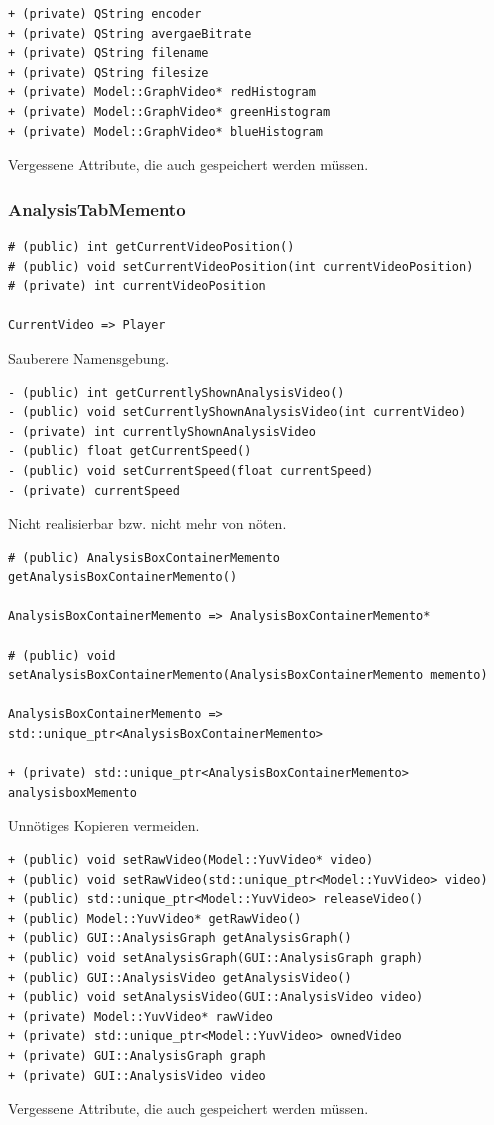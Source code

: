 \documentclass{scrartcl}
\begin{document}
{\begin{verbatim}
+ (private) QString encoder
+ (private) QString avergaeBitrate
+ (private) QString filename
+ (private) QString filesize
+ (private) Model::GraphVideo* redHistogram
+ (private) Model::GraphVideo* greenHistogram
+ (private) Model::GraphVideo* blueHistogram
\end{verbatim}
Vergessene Attribute, die auch gespeichert werden müssen.
\newpage
\subsubsection{AnalysisTabMemento}
\bigskip
\begin{verbatim}
# (public) int getCurrentVideoPosition()
# (public) void setCurrentVideoPosition(int currentVideoPosition)
# (private) int currentVideoPosition

CurrentVideo => Player
\end{verbatim}
Sauberere Namensgebung.
\bigskip
\begin{verbatim}
- (public) int getCurrentlyShownAnalysisVideo()
- (public) void setCurrentlyShownAnalysisVideo(int currentVideo)
- (private) int currentlyShownAnalysisVideo
- (public) float getCurrentSpeed()
- (public) void setCurrentSpeed(float currentSpeed)
- (private) currentSpeed
\end{verbatim}
Nicht realisierbar bzw. nicht mehr von nöten.
\bigskip
\begin{verbatim}
# (public) AnalysisBoxContainerMemento getAnalysisBoxContainerMemento()

AnalysisBoxContainerMemento => AnalysisBoxContainerMemento*

# (public) void setAnalysisBoxContainerMemento(AnalysisBoxContainerMemento memento)

AnalysisBoxContainerMemento => std::unique_ptr<AnalysisBoxContainerMemento>

+ (private) std::unique_ptr<AnalysisBoxContainerMemento> analysisboxMemento
\end{verbatim}
Unnötiges Kopieren vermeiden.
\bigskip
\begin{verbatim}
+ (public) void setRawVideo(Model::YuvVideo* video)
+ (public) void setRawVideo(std::unique_ptr<Model::YuvVideo> video)
+ (public) std::unique_ptr<Model::YuvVideo> releaseVideo()
+ (public) Model::YuvVideo* getRawVideo()
+ (public) GUI::AnalysisGraph getAnalysisGraph()
+ (public) void setAnalysisGraph(GUI::AnalysisGraph graph)
+ (public) GUI::AnalysisVideo getAnalysisVideo()
+ (public) void setAnalysisVideo(GUI::AnalysisVideo video)
+ (private) Model::YuvVideo* rawVideo
+ (private) std::unique_ptr<Model::YuvVideo> ownedVideo
+ (private) GUI::AnalysisGraph graph
+ (private) GUI::AnalysisVideo video
\end{verbatim}
Vergessene Attribute, die auch gespeichert werden müssen.
\newpage
}
\end{document}
